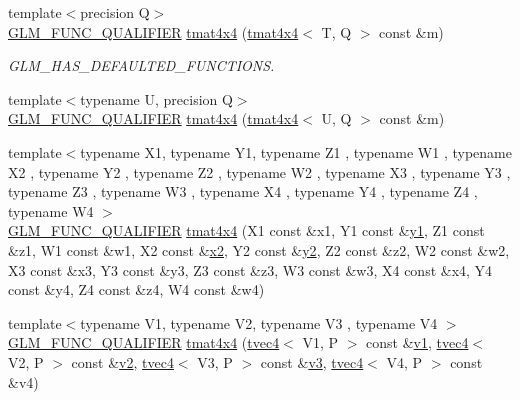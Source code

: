 \begin{DoxyCompactItemize}
\item 
{\footnotesize template$<$precision Q$>$ }\\\mbox{\hyperlink{setup_8hpp_a33fdea6f91c5f834105f7415e2a64407}{G\+L\+M\+\_\+\+F\+U\+N\+C\+\_\+\+Q\+U\+A\+L\+I\+F\+I\+ER}} \mbox{\hyperlink{structglm_1_1tmat4x4_a38fede3f5f8ca53ebc215435945572da}{tmat4x4}} (\mbox{\hyperlink{structglm_1_1tmat4x4}{tmat4x4}}$<$ T, Q $>$ const \&m)
\begin{DoxyCompactList}\small\item\em G\+L\+M\+\_\+\+H\+A\+S\+\_\+\+D\+E\+F\+A\+U\+L\+T\+E\+D\+\_\+\+F\+U\+N\+C\+T\+I\+O\+NS. \end{DoxyCompactList}\item 
{\footnotesize template$<$typename U, precision Q$>$ }\\\mbox{\hyperlink{setup_8hpp_a33fdea6f91c5f834105f7415e2a64407}{G\+L\+M\+\_\+\+F\+U\+N\+C\+\_\+\+Q\+U\+A\+L\+I\+F\+I\+ER}} \mbox{\hyperlink{structglm_1_1tmat4x4_a58ef8d393212acb0d9a3809d1fd05fe4}{tmat4x4}} (\mbox{\hyperlink{structglm_1_1tmat4x4}{tmat4x4}}$<$ U, Q $>$ const \&m)
\item 
{\footnotesize template$<$typename X1, typename Y1, typename Z1 , typename W1 , typename X2 , typename Y2 , typename Z2 , typename W2 , typename X3 , typename Y3 , typename Z3 , typename W3 , typename X4 , typename Y4 , typename Z4 , typename W4 $>$ }\\\mbox{\hyperlink{setup_8hpp_a33fdea6f91c5f834105f7415e2a64407}{G\+L\+M\+\_\+\+F\+U\+N\+C\+\_\+\+Q\+U\+A\+L\+I\+F\+I\+ER}} \mbox{\hyperlink{structglm_1_1tmat4x4_a55fed3aa62bbe056315198d4d7f50db4}{tmat4x4}} (X1 const \&x1, Y1 const \&\mbox{\hyperlink{glad_8h_a48340161068d267815ac3131e9d03def}{y1}}, Z1 const \&z1, W1 const \&w1, X2 const \&\mbox{\hyperlink{glad_8h_ad2cea6eadb01f017f0d57e7edf0ce988}{x2}}, Y2 const \&\mbox{\hyperlink{glad_8h_af7158b5d27f7a6aa4ab9973fcc3a5c20}{y2}}, Z2 const \&z2, W2 const \&w2, X3 const \&x3, Y3 const \&y3, Z3 const \&z3, W3 const \&w3, X4 const \&x4, Y4 const \&y4, Z4 const \&z4, W4 const \&w4)
\item 
{\footnotesize template$<$typename V1, typename V2, typename V3 , typename V4 $>$ }\\\mbox{\hyperlink{setup_8hpp_a33fdea6f91c5f834105f7415e2a64407}{G\+L\+M\+\_\+\+F\+U\+N\+C\+\_\+\+Q\+U\+A\+L\+I\+F\+I\+ER}} \mbox{\hyperlink{structglm_1_1tmat4x4_ac1a85b66f907df34234fa6860cfa2cf1}{tmat4x4}} (\mbox{\hyperlink{structglm_1_1tvec4}{tvec4}}$<$ V1, P $>$ const \&\mbox{\hyperlink{glad_8h_a0779c3b73f9aa3a0ac5b0139b5d291d9}{v1}}, \mbox{\hyperlink{structglm_1_1tvec4}{tvec4}}$<$ V2, P $>$ const \&\mbox{\hyperlink{glad_8h_a9a09a1837922b2b806f4589096a52049}{v2}}, \mbox{\hyperlink{structglm_1_1tvec4}{tvec4}}$<$ V3, P $>$ const \&\mbox{\hyperlink{glad_8h_acc806b31cbf466ceba6555983d8b814d}{v3}}, \mbox{\hyperlink{structglm_1_1tvec4}{tvec4}}$<$ V4, P $>$ const \&v4)

\end{DoxyCompactItemize}
